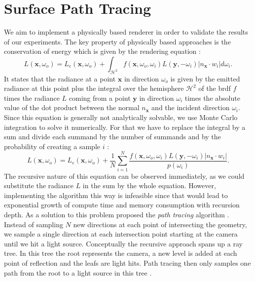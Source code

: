 \section{Surface Path Tracing}
We aim to implement a physically based renderer in order to validate the results of our experiments.
The key property of physically based approaches is the conservation of energy which is given by the rendering equation \cite{rendering_equation}:
\begin{equation}
    \label{eq:render_equation}
    L(\boldsymbol{x}, \omega_o) = L_e(\boldsymbol{x}, \omega_o) + \int_{\mathcal{H}^2} f(\boldsymbol{x}, \omega_o, \omega_i) L(\boldsymbol{y}, -\omega_i) |n_{\boldsymbol{x}} \cdot w_i| d\omega_i.
\end{equation}
It states that the radiance at a point $\boldsymbol{x}$ in direction $\omega_o$ is given by the emitted radiance at this point plus the integral over the hemisphere $\mathcal{H}^2$ of the \ac{brdf} $f$ times the radiance $L$ coming from a point $\boldsymbol{y}$ in direction $\omega_i$ times the absolute value of the dot product between the normal $n_{\boldsymbol{x}}$ and the incident direction $\omega_i$.
Since this equation is generally not analytically solvable, we use Monte Carlo integration to solve it numerically.
For that we have to replace the integral by a sum and divide each summand by the number of summands and by the probability of creating a sample $i$ \cite{pbr}:
\begin{equation*}
    L(\boldsymbol{x}, \omega_o) = L_e(\boldsymbol{x}, \omega_o) + \frac{1}{N}\sum_{i=1}^{N} \frac{f(\boldsymbol{x}, \omega_o, \omega_i) L(\boldsymbol{y}, -\omega_i) |n_{\boldsymbol{x}} \cdot w_i|}{p(\omega_i)}.
\end{equation*}
The recursive nature of this equation can be observed immediately, as we could substitute the radiance $L$ in the sum by the whole equation.
However, implementing the algorithm this way is infeasible since that would lead to exponential growth of compute time and memory consumption with recursion depth.
As a solution to this problem \citeauthor{rendering_equation} proposed the \textit{path tracing} algorithm \cite{rendering_equation}.
Instead of sampling $N$ new directions at each point of intersecting the geometry, we sample a single direction at each intersection point starting at the camera until we hit a light source.
Conceptually the recursive approach spans up a ray tree.
In this tree the root represents the camera, a new level is added at each point of reflection and the leafs are light hits.
Path tracing then only samples one path from the root to a light source in this tree \cite{rendering_equation}.
